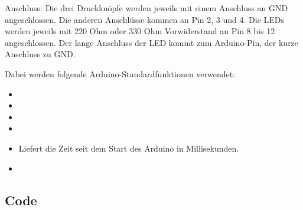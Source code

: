 Anschluss:
Die drei Druckknöpfe werden jeweils mit einem Anschluss an GND angeschlossen. Die anderen Anschlüsse kommen an Pin 2, 3 und 4.
Die LEDs werden jeweils mit 220 Ohm oder 330 Ohm Vorwiderstand an Pin 8 bis 12 angeschlossen. Der lange Anschluss der LED kommt zum Arduino-Pin, der kurze Anschluss zu GND.

Dabei werden folgende Arduino-Standardfunktionen verwendet:

\begin{itemize}
\item {}
\item {}
\item {}
\item {}
\item {} Liefert die Zeit seit dem Start des Arduino in Millisekunden. \cite{arduino_millis}
\item {}
\end{itemize}

\subsection{Code}
{
	\label{lst:druckknoepfeledabfolge}
}







